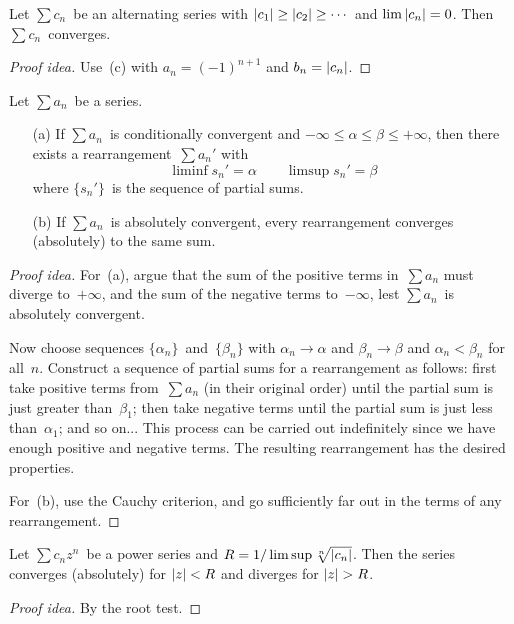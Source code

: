 \begin{cor}
Let \(\sum c_n\)~be an alternating series with \(|{c_1}|\ge|{c_2}|\ge\cdots\) and \(\lim|{c_n}|=0\). Then \(\sum c_n\)~converges.
\end{cor}
\begin{proof}[Proof idea]
Use~(c) with \(a_n=(-1)^{n+1}\) and \(b_n=|{c_n}|\).
\end{proof}

\begin{thm}[Rearrangements]
Let \(\sum a_n\)~be a series.
\begin{enumerate}[itemsep=0pt]
\item[(a)] If \(\sum a_n\)~is conditionally convergent and \(-\infty\le\alpha\le\beta\le+\infty\), then there exists a rearrangement~\(\sum a_n'\) with
\[\liminf s_n'=\alpha\qquad\limsup s_n'=\beta\]
where \(\{s_n'\}\)~is the sequence of partial sums.
\item[(b)] If \(\sum a_n\)~is absolutely convergent, every rearrangement converges (absolutely) to the same sum.
\end{enumerate}
\end{thm}
\begin{proof}[Proof idea]
For~(a), argue that the sum of the positive terms in~\(\sum a_n\) must diverge to~\(+\infty\), and the sum of the negative terms to~\(-\infty\), lest \(\sum a_n\)~is absolutely convergent.

Now choose sequences \(\{\alpha_n\}\)~and~\(\{\beta_n\}\) with \(\alpha_n\to\alpha\) and \(\beta_n\to\beta\) and \(\alpha_n<\beta_n\) for all~\(n\). Construct a sequence of partial sums for a rearrangement as follows: first take positive terms from~\(\sum a_n\) (in their original order) until the partial sum is just greater than~\(\beta_1\); then take negative terms until the partial sum is just less than~\(\alpha_1\); and so on... This process can be carried out indefinitely since we have enough positive and negative terms. The resulting rearrangement has the desired properties.

For~(b), use the Cauchy criterion, and go sufficiently far out in the terms of any rearrangement.
\end{proof}

\begin{thm}
Let \(\sum c_nz^n\)~be a power series and \(R=1/\limsup\sqrt[n]{|{c_n}|}\). Then the series converges (absolutely) for \(|{z}|<R\) and diverges for \(\abs{z}>R\).
\end{thm}
\begin{proof}[Proof idea]
By the root test.
\end{proof}

